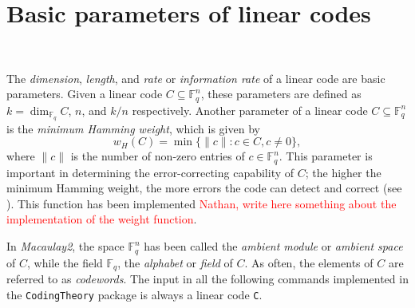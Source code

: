 \documentclass[12pt]{amsart}
\theoremstyle{plain}
\begin{document}
\section{Basic parameters of linear codes}~\label{pro}

The {\it dimension\/}, {\it length\/}, and {\it rate} or {\it information rate}  of a linear code are basic parameters. Given a linear code $C\subseteq \mathbb{F}^n_q$, these parameters are defined as $k=\dim_{\mathbb{F}_q} C$, $n$, and $k/n$ respectively. Another parameter of a linear code $C\subseteq \mathbb{F}^n_q$ is the {\it minimum Hamming weight}, which is given by 
\[
w_H(C)=\min\{\|c\|
\colon  c \in C, c \neq 0\},
\]
where $\| c \|$ is the number of non-zero entries of $c\in \mathbb{F}^n_q$. This parameter is important in determining the error-correcting capability of $C$; the higher the minimum Hamming weight, the more errors the code can detect and correct (see \cite{huf-pless}). This function has been implemented \textcolor{red}{Nathan, write here something about the implementation of the weight function}.

In {\it Macaulay2}, the space $\mathbb{F}_q^n$ has been called the {\it ambient module} or {\it ambient space} of $C$, while the field $\mathbb{F}_q$, the {\it alphabet} or {\it field} of $C$. As often, the elements of $C$ are referred to as {\it codewords}. The input in all the following commands implemented in the {\tt CodingTheory} package is always a linear code  {\tt C}.
 
\medskip
  
\end{document}
